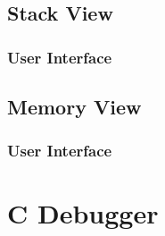 \subsection{Stack View}

\subsubsection{User Interface}

\subsection{Memory View}

\subsubsection{User Interface}

\section{C Debugger}